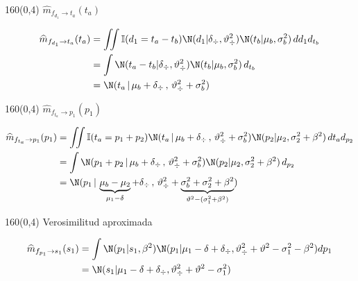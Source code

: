 \documentclass[shownotes,aspectratio=169]{beamer}
\begin{document}
\begin{frame}[plain]
\begin{textblock}{160}(0,4)
 \centering \Large $\widehat{m}_{f_{d_1} \rightarrow t_a}(t_a)$
 \end{textblock}

 
 
 \begin{equation*}
\begin{split}
\widehat{m}_{f_{d_1} \rightarrow t_a}(t_a) & =  \iint \mathbb{I}(d_1 = t_a - t_b) \N(d_1 | \delta_{\div}, \vartheta_{\div}^2) \N(t_b | \mu_b , \sigma_b^2 )  \, d{d_1} d_{t_b} \\
& = \int  \N( t_a-t_b | \delta_{\div}, \vartheta_{\div}^2) \N(t_b | \mu_b , \sigma_b^2 )  \,  d_{t_b} \\
& = \N(t_a \, | \, \mu_b + \delta_{\div} \, , \, \vartheta_{\div}^2 + \sigma_b^2) \\
\end{split}
\end{equation*}
\end{frame}

\begin{frame}[plain]
\begin{textblock}{160}(0,4)
 \centering \Large $\widehat{m}_{f_{t_a} \rightarrow p_1}(p_1)$
\end{textblock}
 \begin{equation*}
 \begin{split}
\widehat{m}_{f_{t_a} \rightarrow p_1}(p_1) &= \iint \mathbb{I}(t_a = p_1 + p_2) \N(t_a \, | \, \mu_b + \delta_{\div} \, , \, \vartheta_{\div}^2 + \sigma_b^2) \N(p_2 | \mu_2 , \sigma_2^2 + \beta^2)  \, d{t_a} d_{p_2} \\
& = \int \N(p_1 + p_2 \, | \, \mu_b + \delta_{\div} \, , \, \vartheta_{\div}^2 + \sigma_b^2) \N(p_2 | \mu_2 , \sigma_2^2+ \beta^2 )   \, d_{p_2} \\
& = \N( p_1 \,|\,  \underbrace{\mu_b - \mu_2}_{\mu_1-\delta} + \delta_{\div}  \,,\,\vartheta_{\div}^2 + \underbrace{\sigma_b^2 + \sigma_2^2 + \beta^2}_{\vartheta^2 - (\sigma_1^2 + \beta^2)})  \\
\end{split}
\end{equation*}
\end{frame}

\begin{frame}[plain]
\begin{textblock}{160}(0,4)
 \centering \Large Verosimilitud aproximada
\end{textblock}

 \begin{equation*}
\begin{split}
\widehat{m}_{f_{p_1} \rightarrow s_1}(s_1) & = \int \N(p_1|s_1,\beta^2) \N(p_1| \mu_1 - \delta + \delta_{\div}, \vartheta_{\div}^2 + \vartheta^2 - \sigma_1^2 - \beta^2)dp_1 \\
& = \N(s_1| \mu_1 - \delta + \delta_{\div}, \vartheta_{\div}^2 + \vartheta^2 - \sigma_1^2)
\end{split}
\end{equation*}
\end{frame}
\end{document}
